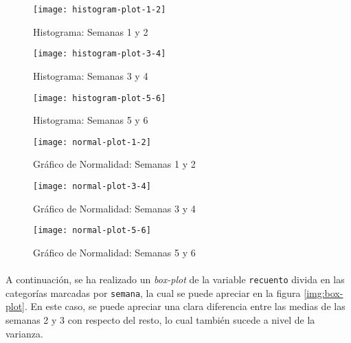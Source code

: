 \documentclass[11pt]{article}
\begin{document}
      \begin{figure}[!h]
        \centering
        \begin{minipage}{.49\textwidth}
          \centering
          \texttt{[image: histogram-plot-1-2]}
          \caption{Histograma: Semanas 1 y 2}
          \label{fig:histogram-plot-1-2}
        \end{minipage}
        \begin{minipage}{.49\textwidth}
          \centering
          \texttt{[image: histogram-plot-3-4]}
          \caption{Histograma: Semanas 3 y 4}
          \label{fig:histogram-plot-3-4}
        \end{minipage}
        \begin{minipage}{.49\textwidth}
          \centering
          \texttt{[image: histogram-plot-5-6]}
          \caption{Histograma: Semanas 5 y 6}
          \label{fig:histogram-plot-5-6}
        \end{minipage}
      \end{figure}

      \begin{figure}[!h]
        \centering
        \begin{minipage}{.49\textwidth}
          \centering
          \texttt{[image: normal-plot-1-2]}
          \caption{Gráfico de Normalidad: Semanas 1 y 2}
          \label{fig:normal-plot-1-2}
        \end{minipage}
        \begin{minipage}{.49\textwidth}
          \centering
          \texttt{[image: normal-plot-3-4]}
          \caption{Gráfico de Normalidad: Semanas 3 y 4}
          \label{fig:normal-plot-3-4}
        \end{minipage}
        \begin{minipage}{.49\textwidth}
          \centering
          \texttt{[image: normal-plot-5-6]}
          \caption{Gráfico de Normalidad: Semanas 5 y 6}
          \label{fig:normal-plot-5-6}
        \end{minipage}
      \end{figure}

      \paragraph{}
      A continuación, se ha realizado un \emph{box-plot} de la variable \texttt{recuento} divida en las categorías marcadas por \texttt{semana}, la cual se puede apreciar en la figura \ref{img:box-plot}. En este caso, se puede apreciar una clara diferencia entre las medias de las semanas 2 y 3 con respecto del resto, lo cual también sucede a nivel de la varianza.
\end{document}
